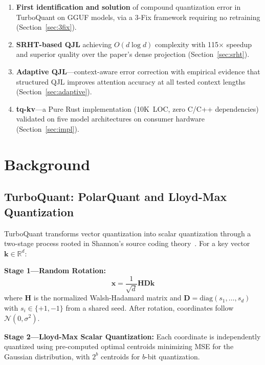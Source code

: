 \documentclass[11pt]{article}
\begin{document}
\begin{enumerate}
    \item \textbf{First identification and solution} of compound quantization error in TurboQuant on GGUF models, via a 3-Fix framework requiring no retraining (Section~\ref{sec:3fix}).
    \item \textbf{SRHT-based QJL} achieving $O(d \log d)$ complexity with 115$\times$ speedup and superior quality over the paper's dense projection (Section~\ref{sec:srht}).
    \item \textbf{Adaptive QJL}---context-aware error correction with empirical evidence that structured QJL improves attention accuracy at all tested context lengths (Section~\ref{sec:adaptive}).
    \item \textbf{tq-kv}---a Pure Rust implementation (10K~LOC, zero C/C++ dependencies) validated on five model architectures on consumer hardware (Section~\ref{sec:impl}).
\end{enumerate}

\section{Background}

\subsection{TurboQuant: PolarQuant and Lloyd-Max Quantization}

TurboQuant transforms vector quantization into scalar quantization through a two-stage process rooted in Shannon's source coding theory~\citep{zandieh2026turboquant}. For a key vector $\mathbf{k} \in \mathbb{R}^d$:

\textbf{Stage 1---Random Rotation:}
\begin{equation}
    \mathbf{x} = \frac{1}{\sqrt{d}} \mathbf{H} \mathbf{D} \mathbf{k}
\end{equation}
where $\mathbf{H}$ is the normalized Walsh-Hadamard matrix and $\mathbf{D} = \mathrm{diag}(s_1, \ldots, s_d)$ with $s_i \in \{+1, -1\}$ from a shared seed. After rotation, coordinates follow $\mathcal{N}(0, \sigma^2)$.

\textbf{Stage 2---Lloyd-Max Scalar Quantization:}
Each coordinate is independently quantized using pre-computed optimal centroids minimizing MSE for the Gaussian distribution, with $2^b$ centroids for $b$-bit quantization.
\end{document}
